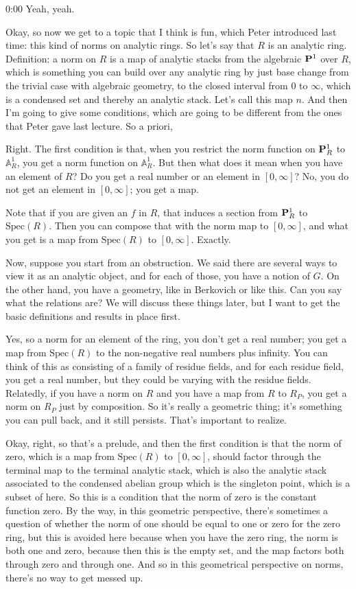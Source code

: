 \begin{unfinished}{0:00}
Yeah, yeah.

Okay, so now we get to a topic that I think is fun, which Peter introduced last time: this kind of norms on analytic rings. So let's say that $R$ is an analytic ring. Definition: a norm on $R$ is a map of analytic stacks from the algebraic $\P^1$ over $R$, which is something you can build over any analytic ring by just base change from the trivial case with algebraic geometry, to the closed interval from $0$ to $\infty$, which is a condensed set and thereby an analytic stack. Let's call this map $n$. And then I'm going to give some conditions, which are going to be different from the ones that Peter gave last lecture. So a priori,

Right. The first condition is that, when you restrict the norm function on $\P^1_R$ to $\mathbb{A}^1_R$, you get a norm function on $\mathbb{A}^1_R$. But then what does it mean when you have an element of $R$? Do you get a real number or an element in $[0, \infty]$? No, you do not get an element in $[0, \infty]$; you get a map.

Note that if you are given an $f$ in $R$, that induces a section from $\P^1_R$ to $\mathrm{Spec}(R)$. Then you can compose that with the norm map to $[0, \infty]$, and what you get is a map from $\mathrm{Spec}(R)$ to $[0, \infty]$. Exactly.

Now, suppose you start from an obstruction. We said there are several ways to view it as an analytic object, and for each of those, you have a notion of $G$. On the other hand, you have a geometry, like in Berkovich or like this. Can you say what the relations are? We will discuss these things later, but I want to get the basic definitions and results in place first.

Yes, so a norm for an element of the ring, you don't get a real number; you get a map from $\mathrm{Spec}(R)$ to the non-negative real numbers plus infinity. You can think of this as consisting of a family of residue fields, and for each residue field, you get a real number, but they could be varying with the residue fields. Relatedly, if you have a norm on $R$ and you have a map from $R$ to $R_P$, you get a norm on $R_P$ just by composition. So it's really a geometric thing; it's something you can pull back, and it still persists. That's important to realize.

Okay, right, so that's a prelude, and then the first condition is that the norm of zero, which is a map from $\mathrm{Spec}(R)$ to $[0, \infty]$, should factor through the terminal map to the terminal analytic stack, which is also the analytic stack associated to the condensed abelian group which is the singleton point, which is a subset of here. So this is a condition that the norm of zero is the constant function zero. By the way, in this geometric perspective, there's sometimes a question of whether the norm of one should be equal to one or zero for the zero ring, but this is avoided here because when you have the zero ring, the norm is both one and zero, because then this is the empty set, and the map factors both through zero and through one. And so in this geometrical perspective on norms, there's no way to get messed up.


\end{unfinished}
